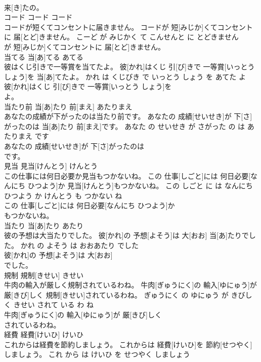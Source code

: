 \documentclass[8pt]{extreport}
\begin{document}
\begin{CJK}{UTF8}{min}
\\	来[き]たの。			
\\	コード	コード	コード	
\\	コードが短くてコンセントに届きません。	コードが 短[みじか]くてコンセントに 届[とど]きません。	こーど が みじかく て こんせんと に とどきません	
\\	が 短[みじか]くてコンセントに 届[とど]きません。			
\\	当てる	当[あ]てる	あてる	
\\	彼はくじ引きで一等賞を当てたよ。	彼[かれ]はくじ 引[び]きで 一等賞[いっとう しょう]を 当[あ]てたよ。	かれ は くじびき で いっとう しょう を あてた よ	
\\	彼[かれ]はくじ 引[び]きで 一等賞[いっとう しょう]を
\\	よ。			
\\	当たり前	当[あ]たり 前[まえ]	あたりまえ	
\\	あなたの成績が下がったのは当たり前です。	あなたの 成績[せいせき]が 下[さ]がったのは 当[あ]たり 前[まえ]です。	あなた の せいせき が さがった の は あたりまえ です	
\\	あなたの 成績[せいせき]が 下[さ]がったのは
\\	です。			
\\	見当	見当[けんとう]	けんとう	
\\	この仕事には何日必要か見当もつかないね。	この 仕事[しごと]には 何日必要[なんにち ひつよう]か 見当[けんとう]もつかないね。	この しごと に は なんにち ひつよう か けんとう も つかない ね	
\\	この 仕事[しごと]には 何日必要[なんにち ひつよう]か
\\	もつかないね。			
\\	当たり	当[あ]たり	あたり	
\\	彼の予想は大当たりでした。	彼[かれ]の 予想[よそう]は 大[おお] 当[あ]たりでした。	かれ の よそう は おおあたり でした	
\\	彼[かれ]の 予想[よそう]は 大[おお]
\\	でした。			
\\	規制	規制[きせい]	きせい	
\\	牛肉の輸入が厳しく規制されているわね。	牛肉[ぎゅうにく]の 輸入[ゆにゅう]が 厳[きび]しく 規制[きせい]されているわね。	ぎゅうにく の ゆにゅう が きびしく きせい されて いる わ ね	
\\	牛肉[ぎゅうにく]の 輸入[ゆにゅう]が 厳[きび]しく
\\	されているわね。			
\\	経費	経費[けいひ]	けいひ	
\\	これからは経費を節約しましょう。	これからは 経費[けいひ]を 節約[せつやく]しましょう。	これ から は けいひ を せつやく しましょう	

\end{CJK}
\end{document}

